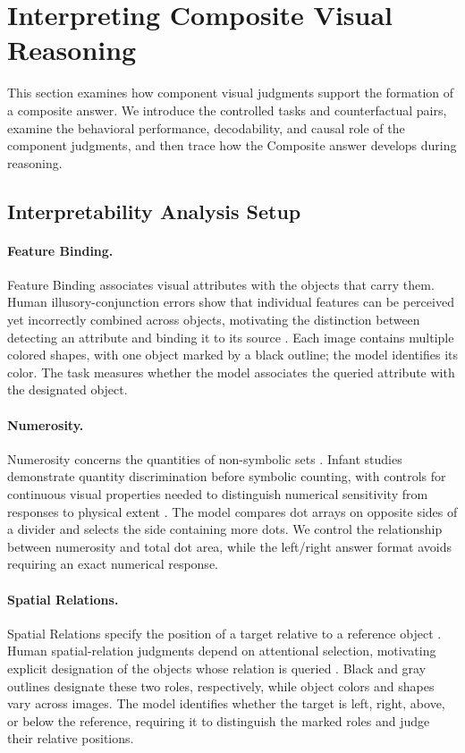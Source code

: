 \documentclass{article} %
\begin{document}
\section{Interpreting Composite Visual Reasoning}
\label{sec:interpretability}

This section examines how component visual judgments support the formation of a composite answer. We introduce the controlled tasks and counterfactual pairs, examine the behavioral performance, decodability, and causal role of the component judgments, and then trace how the Composite answer develops during reasoning.

\subsection{Interpretability Analysis Setup}
\label{sec:primitive}

\paragraph{Feature Binding.}
Feature Binding associates visual attributes with the objects that carry them. Human illusory-conjunction errors show that individual features can be perceived yet incorrectly combined across objects, motivating the distinction between detecting an attribute and binding it to its source \citep{treisman1980feature,treisman1982illusory}. Each image contains multiple colored shapes, with one object marked by a black outline; the model identifies its color. The task measures whether the model associates the queried attribute with the designated object.

\paragraph{Numerosity.}
Numerosity concerns the quantities of non-symbolic sets \citep{feigenson2004core}. Infant studies demonstrate quantity discrimination before symbolic counting, with controls for continuous visual properties needed to distinguish numerical sensitivity from responses to physical extent \citep{xu2000large}. The model compares dot arrays on opposite sides of a divider and selects the side containing more dots. We control the relationship between numerosity and total dot area, while the left/right answer format avoids requiring an exact numerical response.

\paragraph{Spatial Relations.}
Spatial Relations specify the position of a target relative to a reference object \citep{carlson1999what}. Human spatial-relation judgments depend on attentional selection, motivating explicit designation of the objects whose relation is queried \citep{logan1994spatial}. Black and gray outlines designate these two roles, respectively, while object colors and shapes vary across images. The model identifies whether the target is left, right, above, or below the reference, requiring it to distinguish the marked roles and judge their relative positions.
\end{document}

